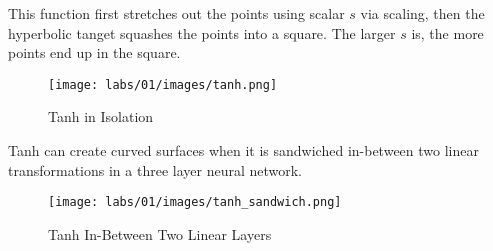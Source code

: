 This function first stretches out the points using scalar $s$ via scaling, then the hyperbolic tanget squashes the points into a square.
The larger $s$ is, the more points end up in the square.

\begin{figure}[ht]
\begin{center}
\texttt{[image: labs/01/images/tanh.png]}
\end{center} 
\caption{Tanh in Isolation}
\end{figure}

Tanh can create curved surfaces when it is sandwiched in-between two linear transformations in a three layer neural network.

\begin{figure}[ht]
\begin{center}
\texttt{[image: labs/01/images/tanh\_sandwich.png]}
\end{center} 
\caption{Tanh In-Between Two Linear Layers}
\end{figure}
